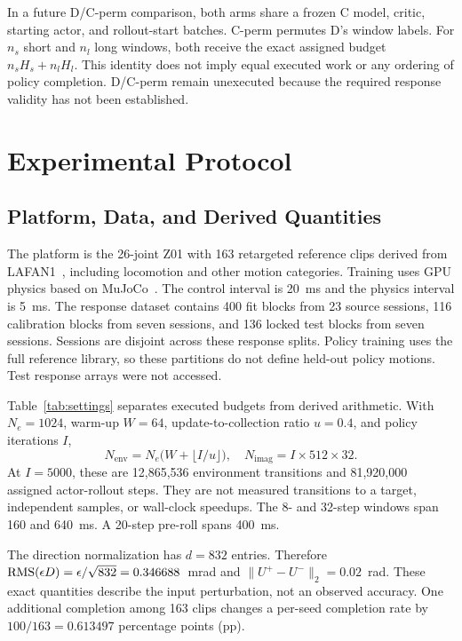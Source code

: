 In a future D/C-perm comparison, both arms share a frozen C model, critic, starting actor, and rollout-start batches. C-perm permutes D's window labels. For $n_s$ short and $n_l$ long windows, both receive the exact assigned budget $n_sH_s+n_lH_l$. This identity does not imply equal executed work or any ordering of policy completion. D/C-perm remain unexecuted because the required response validity has not been established.

\section{Experimental Protocol}
\subsection{Platform, Data, and Derived Quantities}
The platform is the 26-joint Z01 with 163 retargeted reference clips derived from LAFAN1~\cite{lafan}, including locomotion and other motion categories. Training uses GPU physics based on MuJoCo~\cite{mujoco}. The control interval is 20~ms and the physics interval is 5~ms. The response dataset contains 400 fit blocks from 23 source sessions, 116 calibration blocks from seven sessions, and 136 locked test blocks from seven sessions. Sessions are disjoint across these response splits. Policy training uses the full reference library, so these partitions do not define held-out policy motions. Test response arrays were not accessed.

Table~\ref{tab:settings} separates executed budgets from derived arithmetic. With $N_e=1024$, warm-up $W=64$, update-to-collection ratio $u=0.4$, and policy iterations $I$,
\begin{equation}
N_{\mathrm{env}}=N_e\bigl(W+\lfloor I/u\rfloor\bigr),\quad
N_{\mathrm{imag}}=I\times512\times32.
\label{eq:budget}
\end{equation}
At $I=5000$, these are 12,865,536 environment transitions and 81,920,000 assigned actor-rollout steps. They are not measured transitions to a target, independent samples, or wall-clock speedups. The 8- and 32-step windows span 160 and 640~ms. A 20-step pre-roll spans 400~ms.

The direction normalization has $d=832$ entries. Therefore $\operatorname{RMS}(\epsilon D)=\epsilon/\sqrt{832}=0.346688$~mrad and $\|U^+-U^-\|_2=0.02$~rad. These exact quantities describe the input perturbation, not an observed accuracy. One additional completion among 163 clips changes a per-seed completion rate by $100/163=0.613497$ percentage points (pp).

